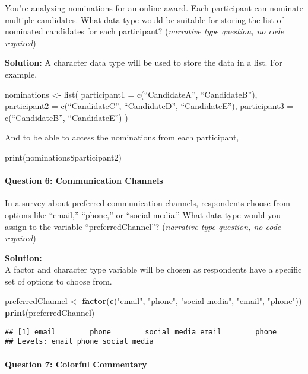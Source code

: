 \documentclass[
]{article}
\newenvironment{Shaded}{\begin{snugshade}}{\end{snugshade}}
\newcommand{\FunctionTok}[1]{\textcolor[rgb]{0.13,0.29,0.53}{\textbf{#1}}}
\newcommand{\NormalTok}[1]{#1}
\newcommand{\OtherTok}[1]{\textcolor[rgb]{0.56,0.35,0.01}{#1}}
\newcommand{\StringTok}[1]{\textcolor[rgb]{0.31,0.60,0.02}{#1}}
\begin{document}
You're analyzing nominations for an online award. Each participant can
nominate multiple candidates. What data type would be suitable for
storing the list of nominated candidates for each participant?
(\emph{narrative type question, no code required})

\textbf{Solution:} A character data type will be used to store the data
in a list. For example,

nominations \textless- list( participant1 = c(``CandidateA'',
``CandidateB''), participant2 = c(``CandidateC'', ``CandidateD'',
``CandidateE''), participant3 = c(``CandidateB'', ``CandidateE'') )

And to be able to access the nominations from each participant,

print(nominations\$participant2)

\hypertarget{question-6-communication-channels}{%
\paragraph{Question 6: Communication
Channels}\label{question-6-communication-channels}}

In a survey about preferred communication channels, respondents choose
from options like ``email,'' ``phone,'' or ``social media.'' What data
type would you assign to the variable ``preferredChannel''?
(\emph{narrative type question, no code required})

\textbf{Solution:}\\
A factor and character type variable will be chosen as respondents have
a specific set of options to choose from.

\begin{Shaded}
\begin{Highlighting}[]
\NormalTok{preferredChannel }\OtherTok{\textless{}{-}} \FunctionTok{factor}\NormalTok{(}\FunctionTok{c}\NormalTok{(}\StringTok{"email"}\NormalTok{, }\StringTok{"phone"}\NormalTok{, }\StringTok{"social media"}\NormalTok{, }\StringTok{"email"}\NormalTok{, }\StringTok{"phone"}\NormalTok{))}
\FunctionTok{print}\NormalTok{(preferredChannel)}
\end{Highlighting}
\end{Shaded}

\begin{verbatim}
## [1] email        phone        social media email        phone       
## Levels: email phone social media
\end{verbatim}

\hypertarget{question-7-colorful-commentary}{%
\paragraph{Question 7: Colorful
Commentary}\label{question-7-colorful-commentary}}
\end{document}
